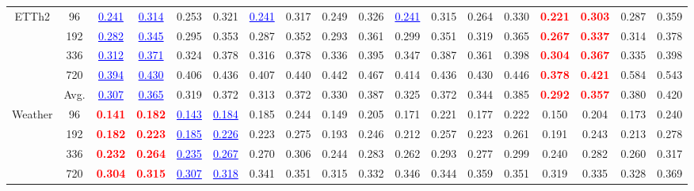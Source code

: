 \begin{table}[t]
{\begin{tabular}{cc|cc|cc|cc|cc|cc|cc|cc|cc}
\midrule
\multirow{5}{*}{ETTh2} & 96 & \textcolor{blue}{\underline{0.241}} & \textcolor{blue}{\underline{0.314}} & 0.253 & 0.321 & \textcolor{blue}{\underline{0.241}} & 0.317 & 0.249 & 0.326 & \textcolor{blue}{\underline{0.241}} & 0.315 & 0.264 & 0.330 & \textcolor{red}{\textbf{0.221}} & \textcolor{red}{\textbf{0.303}} & 0.287 & 0.359 \\
 & 192 & \textcolor{blue}{\underline{0.282}} & \textcolor{blue}{\underline{0.345}} & 0.295 & 0.353 & 0.287 & 0.352 & 0.293 & 0.361 & 0.299 & 0.351 & 0.319 & 0.365 & \textcolor{red}{\textbf{0.267}} & \textcolor{red}{\textbf{0.337}} & 0.314 & 0.378 \\
 & 336 & \textcolor{blue}{\underline{0.312}} & \textcolor{blue}{\underline{0.371}} & 0.324 & 0.378 & 0.316 & 0.378 & 0.336 & 0.395 & 0.347 & 0.387 & 0.361 & 0.398 & \textcolor{red}{\textbf{0.304}} & \textcolor{red}{\textbf{0.367}} & 0.335 & 0.398 \\
 & 720 & \textcolor{blue}{\underline{0.394}} & \textcolor{blue}{\underline{0.430}} & 0.406 & 0.436 & 0.407 & 0.440 & 0.442 & 0.467 & 0.414 & 0.436 & 0.430 & 0.446 & \textcolor{red}{\textbf{0.378}} & \textcolor{red}{\textbf{0.421}} & 0.584 & 0.543 \\
\cmidrule(lr){2-18}
 & Avg. & \textcolor{blue}{\underline{0.307}} & \textcolor{blue}{\underline{0.365}} & 0.319 & 0.372 & 0.313 & 0.372 & 0.330 & 0.387 & 0.325 & 0.372 & 0.344 & 0.385 & \textcolor{red}{\textbf{0.292}} & \textcolor{red}{\textbf{0.357}} & 0.380 & 0.420 \\
\midrule
\multirow{5}{*}{Weather} & 96 & \textcolor{red}{\textbf{0.141}} & \textcolor{red}{\textbf{0.182}} & \textcolor{blue}{\underline{0.143}} & \textcolor{blue}{\underline{0.184}} & 0.185 & 0.244 & 0.149 & 0.205 & 0.171 & 0.221 & 0.177 & 0.222 & 0.150 & 0.204 & 0.173 & 0.240 \\
 & 192 & \textcolor{red}{\textbf{0.182}} & \textcolor{red}{\textbf{0.223}} & \textcolor{blue}{\underline{0.185}} & \textcolor{blue}{\underline{0.226}} & 0.223 & 0.275 & 0.193 & 0.246 & 0.212 & 0.257 & 0.223 & 0.261 & 0.191 & 0.243 & 0.213 & 0.278 \\
 & 336 & \textcolor{red}{\textbf{0.232}} & \textcolor{red}{\textbf{0.264}} & \textcolor{blue}{\underline{0.235}} & \textcolor{blue}{\underline{0.267}} & 0.270 & 0.306 & 0.244 & 0.283 & 0.262 & 0.293 & 0.277 & 0.299 & 0.240 & 0.282 & 0.260 & 0.317 \\
 & 720 & \textcolor{red}{\textbf{0.304}} & \textcolor{red}{\textbf{0.315}} & \textcolor{blue}{\underline{0.307}} & \textcolor{blue}{\underline{0.318}} & 0.341 & 0.351 & 0.315 & 0.332 & 0.346 & 0.344 & 0.359 & 0.351 & 0.319 & 0.335 & 0.328 & 0.369 \\

\end{tabular}}
\end{table}
